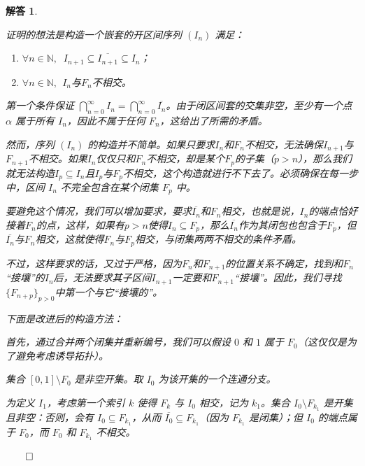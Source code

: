 \documentclass[12pt,UTF8,fontset=none]{ctexbook}
\theoremstyle{exercisestyle}
\theoremstyle{solutionstyle}
\newtheorem*{solution*}{解答}
\newenvironment{solution}
  {\begin{solution*}}
  {\hfill\ensuremath{\qed}\end{solution*}}
\begin{document}
\begin{solution}
\begin{subquestions}
    证明的想法是构造一个嵌套的开区间序列 \((I_n)\) 满足：
    \begin{enumerate}
      \item $\forall n\in\mathbb{N},\;\; I_{n+1} \subseteq \overline{I_{n+1}} \subseteq I_{n} $；
      \item $\forall n\in\mathbb{N},\;\,I_n$与$F_n$不相交。
    \end{enumerate}

    第一个条件保证 \(\bigcap_{n=0}^{\infty} I_n = \bigcap_{n=0}^{\infty} \overline{I_n}\)。由于闭区间套的交集非空，至少有一个点 \(\alpha\) 属于所有 \(I_n\)，因此不属于任何 \(F_n\)，这给出了所需的矛盾。
    
    然而，序列 \((I_n)\) 的构造并不简单。如果只要求$I_n$和$F_n$不相交，无法确保$I_{n+1}$与$F_{n+1}$不相交。如果$I_n$仅仅只和$F_n$不相交，却是某个$F_p$的子集（$p > n$），那么我们就无法构造$I_p\subseteq I_n$且$I_p$与$F_p$不相交，这个构造就进行不下去了。必须确保在每一步中，区间 \(I_n\) 不完全包含在某个闭集 \(F_p\) 中。

    要避免这个情况，我们可以增加要求，要求$\overline{I_n}$和$F_n$相交，也就是说，$I_n$的端点恰好接着$F_n$的点，这样，如果有$p>n$使得$I_n\subseteq F_p$，那么$\overline{I_n}$作为其闭包也包含于$F_p$，但$\overline{I_n}$与$F_n$相交，这就使得$F_n$与$F_p$相交，与闭集两两不相交的条件矛盾。

    不过，这样要求的话，又过于严格，因为$F_n$和$F_{n+1}$的位置关系不确定，找到和$F_n$“接壤”的$I_n$后，无法要求其子区间$I_{n+1}$一定要和$F_{n+1}$“接壤”。因此，我们寻找$\{F_{n+p}\}_{p>0}$中第一个与它“接壤的”。

    下面是改进后的构造方法：

    首先，通过合并两个闭集并重新编号，我们可以假设 \( 0 \) 和 \( 1 \) 属于 \( F_0 \)（这仅仅是为了避免考虑诱导拓扑）。

    集合 \([0,1] \setminus F_0\) 是非空开集。取 \( I_0 \) 为该开集的一个连通分支。

    为定义 \( I_1 \)，考虑第一个索引 \( k \) 使得 \( F_k \) 与 \( I_0 \) 相交，记为 \( k_1 \)。集合 \( I_0 \setminus F_{k_1} \) 是开集且非空：否则，会有 \( I_0 \subseteq F_{k_1} \)，从而 \(\overline{I_0} \subseteq F_{k_1}\)（因为 \( F_{k_1} \) 是闭集）；但 \( I_0 \) 的端点属于 \( F_0 \)，而 \( F_0 \) 和 \( F_{k_1} \) 不相交。


\end{subquestions}
\end{solution}
\end{document}
